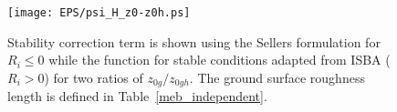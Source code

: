 %
%
%

\begin{figure}[!b]
\centerline{
\texttt{[image: EPS/psi\_H\_z0-z0h.ps]}}
\caption{Stability correction term is shown using the Sellers formulation 
  for $R_i \leq 0$ while the function for stable conditions adapted
  from ISBA ($R_i > 0$) for two ratios of $z_{0g}/z_{0gh}$. The ground surface roughness length is
  defined in Table~\ref{meb_independent}.}
\label{fig:stab_cor_gc}
\end{figure}

